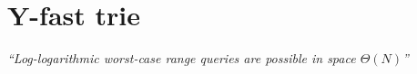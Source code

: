 \section{Y-fast trie}

\emph{``Log-logarithmic worst-case range queries are possible in space \( \Theta(N) \)''}~\cite{Willard1983}
